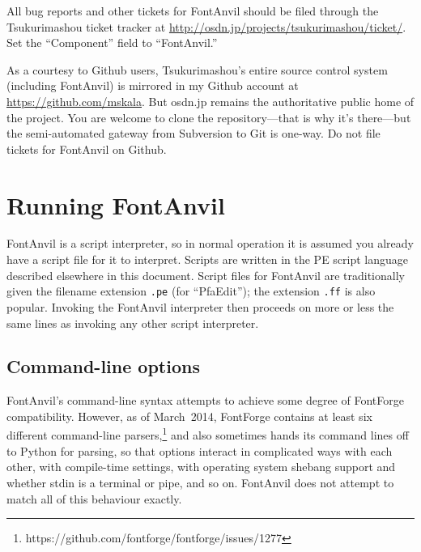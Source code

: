 \documentclass[11pt]{report}
\begin{document}
All bug reports and other tickets for FontAnvil should be filed through
the Tsukurimashou ticket tracker at
\url{http://osdn.jp/projects/tsukurimashou/ticket/}.  Set the
``Component'' field to ``FontAnvil.''

As a courtesy to Github users, Tsukurimashou's entire source control system
(including FontAnvil) is mirrored in my Github account at
\url{https://github.com/mskala}.  But osdn.jp remains the
authoritative public home of the project.  You are welcome to clone the
repository---that is why it's there---but the semi-automated gateway from
Subversion to Git is one-way.  Do not file tickets for FontAnvil on Github.

\clearpage


\chapter{Running FontAnvil}

FontAnvil is a script interpreter, so in normal operation it is assumed you
already have a script file for it to interpret.  Scripts are written in the
PE script language described elsewhere in this document.  Script files for
FontAnvil are traditionally given the filename extension \texttt{.pe} (for
``PfaEdit''); the extension \texttt{.ff} is also popular.  Invoking the
FontAnvil interpreter then proceeds on more or less the same lines as
invoking any other script interpreter.

\section{Command-line options}

\begin{framed}
FontAnvil's command-line syntax attempts to achieve some degree of FontForge
compatibility.  However, as of March~2014, FontForge contains at least six
different command-line
parsers,\footnote{https://github.com/fontforge/fontforge/issues/1277} and
also sometimes hands its command lines off to Python for parsing, so that
options interact in complicated ways with each other, with compile-time
settings, with operating system shebang support and whether stdin is a
terminal or pipe, and so on.  FontAnvil does not attempt to match all of
this behaviour exactly.
\end{framed}
\end{document}
